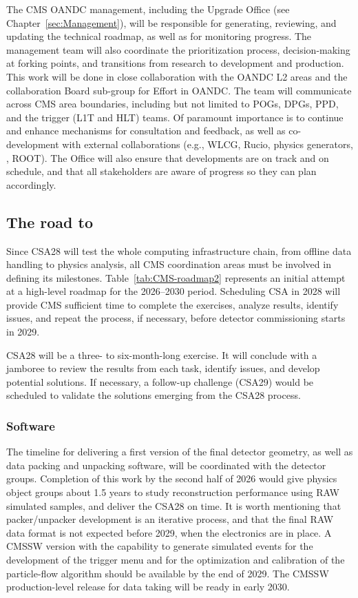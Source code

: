The CMS \gls{OANDC} management, including the Upgrade Office (see Chapter~\ref{sec:Management}), will be responsible for generating, reviewing, and updating the technical roadmap, as well as for monitoring progress. The management team will also coordinate the prioritization process, decision-making at forking points, and transitions from research to development and production. This work will be done in close collaboration with the \gls{OANDC} L2 areas and the collaboration Board sub-group for \PhaseTwo Effort in \gls{OANDC}. The team will communicate across CMS area boundaries, including but not limited to \glspl{POG}, \glspl{DPG}, \gls{PPD}, and the trigger (\gls{L1T} and \gls{HLT}) teams. Of paramount importance is to continue and enhance mechanisms for consultation and feedback, as well as co-development with external collaborations (e.g., \gls{WLCG}, Rucio, physics generators, \GEANTfour, \textsc{ROOT}). The Office will also ensure that developments are on track and on schedule, and that all stakeholders are aware of progress so they can plan accordingly. 

\subsection{The road to \RunFour}
Since CSA28 will test the whole computing infrastructure chain, from offline data handling to physics analysis, all CMS coordination areas must be involved in defining its milestones. Table~\ref{tab:CMS-roadmap2} represents an initial attempt at a high-level roadmap for the 2026--2030 period. Scheduling \gls{CSA} in 2028 will provide CMS sufficient time to complete the exercises, analyze results, identify issues, and repeat the process, if necessary, before detector commissioning starts in 2029.

CSA28 will be a three- to six-month-long exercise. It will conclude with a jamboree to review the results from each task, identify issues, and develop potential solutions. If necessary, a follow-up challenge (CSA29) would be scheduled to validate the solutions emerging from the CSA28 process.

\subsubsection{Software}
The timeline for delivering a first version of the final detector geometry, as well as data packing and unpacking software, will be coordinated with the detector groups. Completion of this work by the second half of 2026 would give physics object groups about 1.5 years to study reconstruction performance using \gls{RAW} simulated samples, and deliver the CSA28 on time. It is worth mentioning that packer/unpacker development is an iterative process, and that the final \gls{RAW} data format is not expected before 2029, when the electronics are in place. A \gls{CMSSW} version with the capability to generate simulated events for the development of the trigger menu and for the optimization and calibration of the particle-flow algorithm should be available by the end of 2029. The \gls{CMSSW} production-level release for data taking will be ready in early 2030.

